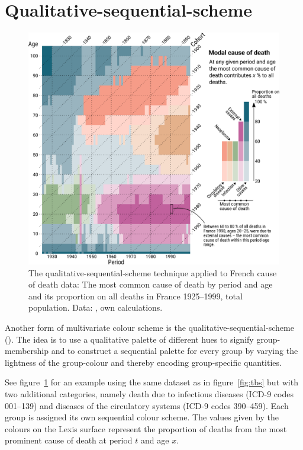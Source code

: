 \documentclass[parskip=half]{scrartcl}
\begin{document}
\section{Qualitative-sequential-scheme} %
\label{sec:qss}

\begin{figure}[!htb]
  \centering
  \includegraphics[width = \textwidth]{./fig/qual_seq.pdf}
  \caption{The qualitative-sequential-scheme technique applied to French cause of death data: The most common cause of death by period and age and its proportion on all deaths in France 1925--1999, total population. Data: \cite{Vallin2014}, own calculations.}
  \label{fig:qss}
\end{figure}

Another form of multivariate colour scheme is the qualitative-sequential-scheme (\cite{Brewer1994a}). The idea is to use a qualitative palette of different hues to signify group-membership and to construct a sequential palette for every group by varying the lightness of the group-colour and thereby encoding group-specific quantities.

See figure~\ref{fig:qss} for an example using the same dataset as in figure~\ref{fig:tbs} but with two additional categories, namely death due to infectious diseases (ICD-9 codes 001--139) and diseases of the circulatory systems (ICD-9 codes 390--459). Each group is assigned its own sequential colour scheme. The values given by the colours on the Lexis surface represent the proportion of deaths from the most prominent cause of death at period $t$ and age $x$.
\end{document}
